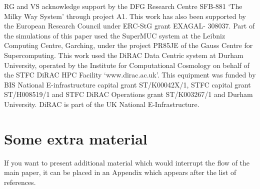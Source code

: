 \documentclass[a4paper,fleqn,usenatbib]{mnras}
\begin{document}
RG and VS acknowledge support by the DFG Research Centre SFB-881 `The
Milky Way System' through project A1. This work has also been
supported by the European Research Council under ERC-StG grant
EXAGAL- 308037. Part of the simulations of this paper used the
SuperMUC system at the Leibniz Computing Centre, Garching,
under the project PR85JE of the Gauss Centre for Supercomputing.
This work used the DiRAC Data Centric system at Durham
University, operated by the Institute for Computational Cosmology
on behalf of the STFC DiRAC HPC Facility `www.dirac.ac.uk'.
This equipment was funded by BIS National E-infrastructure capital 
grant ST/K00042X/1, STFC capital grant ST/H008519/1 and
STFC DiRAC Operations grant ST/K003267/1 and Durham University. 
DiRAC is part of the UK National E-Infrastructure.










\appendix

\section{Some extra material}

If you want to present additional material which would interrupt the flow of the main paper,
it can be placed in an Appendix which appears after the list of references.



\bsp    %
\label{lastpage}
\end{document}
